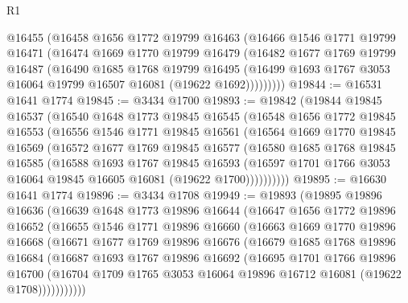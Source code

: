 \begin{lexlean}{R1}
\begin{coremodule}
        @16455
        (@16458
          @1656
          @1772
          @19799
          @16463
          (@16466
            @1546
            @1771
            @19799
            @16471
            (@16474
              @1669
              @1770
              @19799
              @16479
              (@16482
                @1677
                @1769
                @19799
                @16487
                (@16490
                  @1685
                  @1768
                  @19799
                  @16495
                  (@16499 @1693 @1767 @3053 @16064 @19799 @16507 @16081 (@19622 @1692)))))))))
@19844 := @16531 @1641 @1774
@19845 := @3434 @1700
@19893 := @19842
    (@19844
      @19845
      @16537
      (@16540
        @1648
        @1773
        @19845
        @16545
        (@16548
          @1656
          @1772
          @19845
          @16553
          (@16556
            @1546
            @1771
            @19845
            @16561
            (@16564
              @1669
              @1770
              @19845
              @16569
              (@16572
                @1677
                @1769
                @19845
                @16577
                (@16580
                  @1685
                  @1768
                  @19845
                  @16585
                  (@16588
                    @1693
                    @1767
                    @19845
                    @16593
                    (@16597 @1701 @1766 @3053 @16064 @19845 @16605 @16081 (@19622 @1700))))))))))
@19895 := @16630 @1641 @1774
@19896 := @3434 @1708
@19949 := @19893
    (@19895
      @19896
      @16636
      (@16639
        @1648
        @1773
        @19896
        @16644
        (@16647
          @1656
          @1772
          @19896
          @16652
          (@16655
            @1546
            @1771
            @19896
            @16660
            (@16663
              @1669
              @1770
              @19896
              @16668
              (@16671
                @1677
                @1769
                @19896
                @16676
                (@16679
                  @1685
                  @1768
                  @19896
                  @16684
                  (@16687
                    @1693
                    @1767
                    @19896
                    @16692
                    (@16695
                      @1701
                      @1766
                      @19896
                      @16700
                      (@16704 @1709 @1765 @3053 @16064 @19896 @16712 @16081 (@19622 @1708)))))))))))

\end{coremodule}
\end{lexlean}
